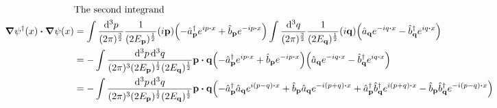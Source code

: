 \documentclass{article}
\begin{document}
\begin{align*}
                                          & \qq*{The second integrand}                                                                                                                                                                                                                                                                                                                                         \\
    \grad\psi^\dagger(x)\vdot\grad\psi(x) & =\int \frac{\dd[3]{p}}{(2\pi)^\frac{3}{2}}  \frac{1}{(2E_{\vb{p}})^{\frac{1}{2}}} (i\vb{p}) \pqty{-\hat{a}^\dagger_{\vb{p}}e^{ip\vdot x}+\hat{b}_{\vb{p}}e^{-ip\vdot x}}\int \frac{\dd[3]{q}}{(2\pi)^\frac{3}{2}}  \frac{1}{(2E_{\vb{q}})^{\frac{1}{2}}} (i\vb{q}) \pqty{\hat{a}_{\vb{q}}e^{-iq\vdot x}-\hat{b}^\dagger_{\vb{q}}e^{iq\vdot x}}                     \\
                                          & =-\int \frac{\dd[3]{p}\dd[3]{q}}{(2\pi)^3(2E_{\vb{p}})^{\frac{1}{2}}(2E_{\vb{q}})^{\frac{1}{2}}}\vb{p}\vdot\vb{q}\pqty{-\hat{a}^\dagger_{\vb{p}}e^{ip\vdot x}+\hat{b}_{\vb{p}}e^{-ip\vdot x}}\pqty{\hat{a}_{\vb{q}}e^{-iq\vdot x}-\hat{b}^\dagger_{\vb{q}}e^{iq\vdot x}}                                                                                           \\
                                          & =-\int \frac{\dd[3]{p}\dd[3]{q}}{(2\pi)^3(2E_{\vb{p}})^{\frac{1}{2}}(2E_{\vb{q}})^{\frac{1}{2}}}\vb{p}\vdot\vb{q}\pqty{-\hat{a}^\dagger_{\vb{p}}\hat{a}_{\vb{q}}e^{i(p-q)\vdot x}+\hat{b}_{\vb{p}}\hat{a}_{\vb{q}}e^{-i(p+q)\vdot x}+\hat{a}^\dagger_{\vb{p}}\hat{b}^\dagger_{\vb{q}}e^{i(p+q)\vdot x}-\hat{b}_{\vb{p}}\hat{b}^\dagger_{\vb{q}}e^{-i(p-q)\vdot x}}
\end{align*}
\end{document}
